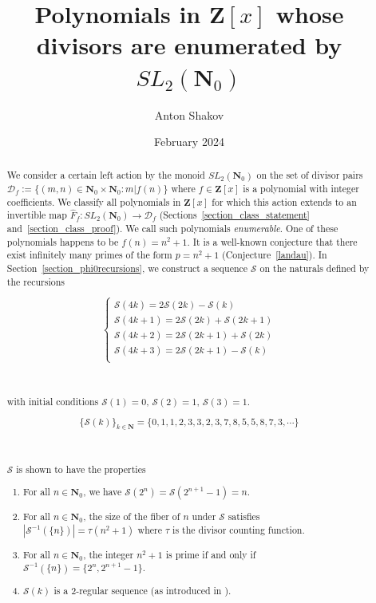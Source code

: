 \documentclass{article}
\title{Polynomials in $\mathbf{Z}[x]$ whose divisors are enumerated by $SL_2(\mathbf{N}_0)$}
\author{Anton Shakov}
\date{February 2024}
\begin{document}
\maketitle




\begin{abstract}
We consider a certain left action by the monoid $SL_2(\mathbf{N}_0)$ on the set of divisor pairs $\mathcal{D}_f := \{ (m, n) \in \mathbf{N}_0 \times \mathbf{N}_0 : m \lvert f(n) \}$ where $f \in \mathbf{Z}[x]$ is a polynomial with integer coefficients. We classify all polynomials in $\mathbf{Z}[x]$ for which this action extends to an invertible map $\hat{F}_f: SL_2(\mathbf{N}_0) \rightarrow \mathcal{D}_f$ (Sections~\ref{section_class_statement} and~\ref{section_class_proof}). We call such polynomials \textit{enumerable}. One of these polynomials happens to be $f(n) = n^2 + 1$. It is a well-known conjecture that there exist infinitely many primes of the form $p = n^2 + 1$ (Conjecture~\ref{landau}). In Section~\ref{section_phi0recursions}, we construct a sequence $\mathcal{S}$ on the naturals defined by the recursions

$$
\begin{cases}
\mathcal{S}(4k) = 2\mathcal{S}(2k) - \mathcal{S}(k) \\
\mathcal{S}(4k+1) = 2\mathcal{S}(2k) + \mathcal{S}(2k+1) \\
\mathcal{S}(4k+2) =  2\mathcal{S}(2k+1) + \mathcal{S}(2k) \\
\mathcal{S}(4k+3) =  2\mathcal{S}(2k+1) - \mathcal{S}(k)  \\
\end{cases}
$$

\

with initial conditions $\mathcal{S}(1) = 0$, $\mathcal{S}(2) = 1$, $\mathcal{S}(3) = 1$. 

$$\{ \mathcal{S}(k) \}_{k \in \mathbf{N}} = \{0,1,1,2,3,3,2,3,7,8,5,5,8,7,3, \cdots \}$$

\

$\mathcal{S}$ is shown to have the  properties

\begin{enumerate}
    \item For all $n \in \mathbf{N}_0$, we have $\mathcal{S}(2^n) = \mathcal{S}(2^{n+1} - 1) = n$.
    \item For all $n \in \mathbf{N}_0$, the size of the fiber of $n$ under $\mathcal{S}$ satisfies $|\mathcal{S}^{-1}(\{n\})| = \tau(n^2 + 1)$ where $\tau$ is the divisor counting function.
    \item For all $n \in \mathbf{N}_0$, the integer $n^2 + 1$ is prime if and only if $\mathcal{S}^{-1}(\{n\}) = \{2^n, 2^{n+1} - 1\}$. 
    \item $\mathcal{S}(k)$ is a $2$-regular sequence (as introduced in \cite{q_regular_sequences}).
\end{enumerate}


\end{abstract}
\end{document}
